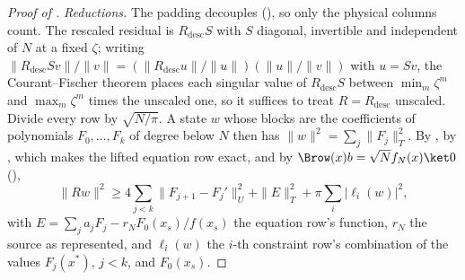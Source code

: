 \begin{proof}[Proof of ]
\emph{Reductions.} The padding decouples (), so only the physical columns count. The rescaled residual is $R_{\mathrm{desc}}S$ with $S$ diagonal, invertible and independent of $N$ at a fixed $\zeta$; writing $\|R_{\mathrm{desc}}Sv\|/\|v\|=(\|R_{\mathrm{desc}}u\|/\|u\|)(\|u\|/\|v\|)$ with $u=Sv$, the Courant--Fischer theorem places each singular value of $R_{\mathrm{desc}}S$ between $\min_m\zeta^m$ and $\max_m\zeta^m$ times the unscaled one, so it suffices to treat $R=R_{\mathrm{desc}}$ unscaled. Divide every row by $\sqrt{N/\pi}$. A state $w$ whose blocks are the coefficients of polynomials $F_0,\dots,F_k$ of degree below $N$ then has $\|w\|^2=\sum_j\|F_j\|_T^2$. By , by , which makes the lifted equation row exact, and by $\Brow(x)b=\sqrt N f_N(x)\ket0$ (),
\begin{equation}
    \|Rw\|^2\ge4\sum_{j<k}\|F_{j+1}-F_j'\|_U^2+\|E\|_T^2+\pi\sum_i|\ell_i(w)|^2 ,
    \label{eq:app-rows-below}
\end{equation}
with $E=\sum_ja_jF_j-r_NF_0(x_s)/f(x_s)$ the equation row's function, $r_N$ the source as represented, and $\ell_i(w)$ the $i$-th constraint row's combination of the values $F_j(x^*)$, $j<k$, and $F_0(x_s)$.


\end{proof}
